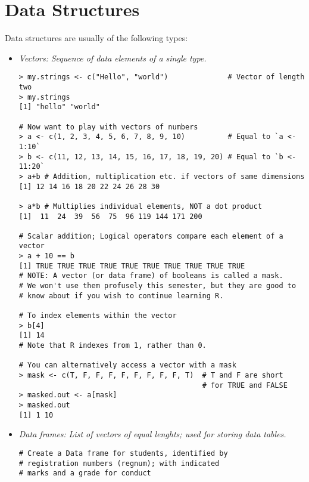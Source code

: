\documentclass[12pt]{article}
\begin{document}

\section{Data Structures}
Data structures are usually of the following types:
\begin{itemize}

\item{\emph{Vectors:}} \emph{Sequence of data elements of a single type.}

\begin{verbatim}
> my.strings <- c("Hello", "world")              # Vector of length two
> my.strings
[1] "hello" "world"

# Now want to play with vectors of numbers
> a <- c(1, 2, 3, 4, 5, 6, 7, 8, 9, 10)          # Equal to `a <- 1:10`
> b <- c(11, 12, 13, 14, 15, 16, 17, 18, 19, 20) # Equal to `b <- 11:20`
> a+b # Addition, multiplication etc. if vectors of same dimensions
[1] 12 14 16 18 20 22 24 26 28 30

> a*b # Multiplies individual elements, NOT a dot product
[1]  11  24  39  56  75  96 119 144 171 200

# Scalar addition; Logical operators compare each element of a vector
> a + 10 == b
[1] TRUE TRUE TRUE TRUE TRUE TRUE TRUE TRUE TRUE TRUE
# NOTE: A vector (or data frame) of booleans is called a mask.
# We won't use them profusely this semester, but they are good to
# know about if you wish to continue learning R.

# To index elements within the vector
> b[4]
[1] 14
# Note that R indexes from 1, rather than 0.

# You can alternatively access a vector with a mask
> mask <- c(T, F, F, F, F, F, F, F, F, T)  # T and F are short
                                           # for TRUE and FALSE
> masked.out <- a[mask]
> masked.out
[1] 1 10

\end{verbatim}

\item{\emph{Data frames:}} \emph{List of vectors of equal lenghts; used for storing data tables.}
\begin{verbatim}
# Create a Data frame for students, identified by
# registration numbers (regnum); with indicated
# marks and a grade for conduct


\end{verbatim}
\end{itemize}
\end{document}
